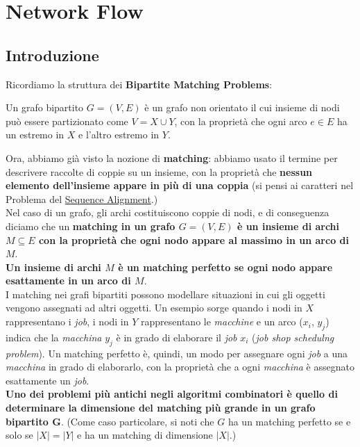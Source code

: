 \chapter{Network Flow}

\section{Introduzione}

Ricordiamo la struttura dei \textbf{Bipartite Matching Problems}:
\begin{myblockquote}
    Un grafo bipartito $G = (V , E)$ è un grafo non
    orientato il cui insieme di nodi può essere partizionato come
    $V = X \cup Y$, con la proprietà che ogni arco $e \in E$ ha un
    estremo in $X$ e l'altro estremo in $Y$.
\end{myblockquote}

Ora, abbiamo già visto la nozione di \textbf{matching}: abbiamo usato il
termine per descrivere raccolte di coppie su un insieme, con la
proprietà che \textbf{nessun elemento dell'insieme appare in più di una
coppia} (si pensi ai caratteri nel Problema del
\protect\hyperlink{sequence-alignment}{Sequence Alignment}.)\\

Nel caso di un grafo, gli archi costituiscono coppie di nodi, e di
conseguenza diciamo che un \textbf{matching in un grafo $G = (V , E)$
è un insieme di archi $M \subseteq E$ con la proprietà che ogni nodo
appare al massimo in un arco di $M$}.\\

\textbf{Un insieme di archi $M$ è un matching perfetto se ogni nodo
appare esattamente in un arco di $M$}.\\

I matching nei grafi bipartiti possono modellare situazioni in cui gli
oggetti vengono assegnati ad altri oggetti. Un esempio sorge quando i
nodi in $X$ rappresentano i \emph{job}, i nodi in $Y$ rappresentano
le \emph{macchine} e un arco ($x_i$, $y_j$) indica che la
\emph{macchina} $y_j$ è in grado di elaborare il \emph{job} $x_i$
(\emph{job shop schedulng problem}). Un matching perfetto è, quindi, un
modo per assegnare ogni \emph{job} a una \emph{macchina} in grado di
elaborarlo, con la proprietà che a ogni \emph{macchina} è assegnato
esattamente un \emph{job}.\\

\textbf{Uno dei problemi più antichi negli algoritmi combinatori è
quello di determinare la dimensione del matching più grande in un grafo
bipartito G}. (Come caso particolare, si noti che $G$ ha un matching
perfetto se e solo se $|X| = |Y|$ e ha un matching di dimensione
$|X|$.)\\

